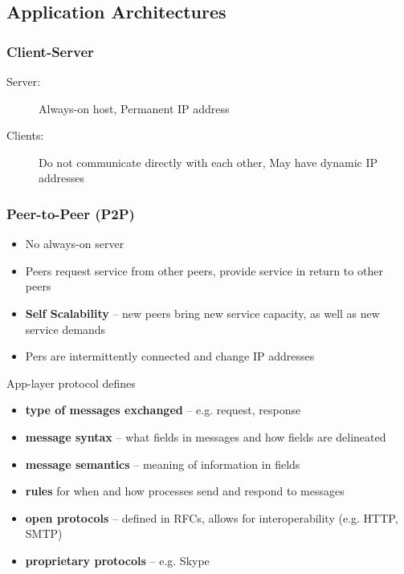 \subsection{Application Architectures}
\subsubsection{Client-Server}
\begin{description}
	\item[Server:] Always-on host, Permanent IP address
	\item[Clients:] Do not communicate directly with each other, May have dynamic IP addresses
\end{description}

\subsubsection{Peer-to-Peer (P2P)}
\begin{itemize}
	\item No always-on server
	\item Peers request service from other peers, provide service in return to other peers
	\item \textbf{Self Scalability} -- new peers bring new service capacity, as well as new service demands
	\item Pers are intermittently connected and change IP addresses
\end{itemize}

\begin{note}{App-layer protocol defines}
	\begin{itemize}
		\item \textbf{type of messages exchanged} -- e.g. request, response
		\item \textbf{message syntax} -- what fields in messages and how fields are delineated
		\item \textbf{message semantics} -- meaning of information in fields
		\item \textbf{rules} for when and how processes send and respond to messages
		\item \textbf{open protocols} -- defined in RFCs, allows for interoperability (e.g. HTTP, SMTP)
		\item \textbf{proprietary protocols} -- e.g. Skype
	\end{itemize}
\end{note}

